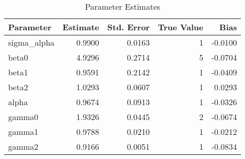 \begin{table}
\caption{Parameter Estimates}
\begin{tabular}{lrrrr}
\toprule
Parameter & Estimate & Std. Error & True Value & Bias \\
\midrule
sigma_alpha & 0.9900 & 0.0163 & 1 & -0.0100 \\
beta0 & 4.9296 & 0.2714 & 5 & -0.0704 \\
beta1 & 0.9591 & 0.2142 & 1 & -0.0409 \\
beta2 & 1.0293 & 0.0607 & 1 & 0.0293 \\
alpha & 0.9674 & 0.0913 & 1 & -0.0326 \\
gamma0 & 1.9326 & 0.0445 & 2 & -0.0674 \\
gamma1 & 0.9788 & 0.0210 & 1 & -0.0212 \\
gamma2 & 0.9166 & 0.0051 & 1 & -0.0834 \\
\bottomrule
\end{tabular}
\end{table}
